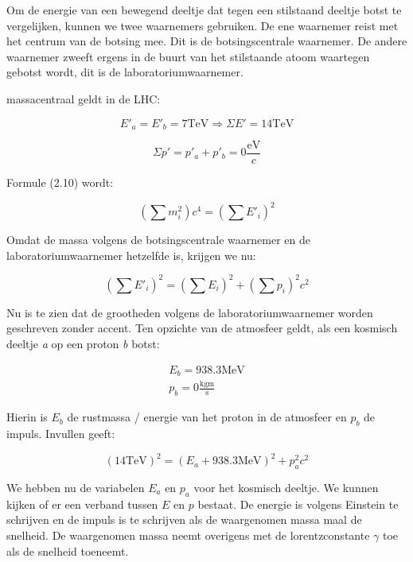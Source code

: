 Om de energie van een bewegend deeltje dat tegen een stilstaand deeltje
botst te vergelijken, kunnen we twee waarnemers gebruiken. De ene
waarnemer reist met het centrum van de botsing mee. Dit is de botsingscentrale
waarnemer. De andere waarnemer zweeft ergens in de buurt van het stilstaande
atoom waartegen gebotst wordt, dit is de laboratoriumwaarnemer.

massacentraal geldt in de LHC:

\begin{equation}
E'_{a}=E'_{b}=7\mathrm{TeV}\Longrightarrow\Sigma E'=\mathrm{14TeV}
\end{equation}


\begin{equation}
\Sigma p'=p'_{a}+p'_{b}=0\frac{\mathrm{eV}}{c}
\end{equation}


Formule (2.10) wordt:

\begin{equation}
\left(\sum m_{i}^{2}\right)c^{4}=\left(\sum E'_{i}\right)^{2}
\end{equation}


Omdat de massa volgens de botsingscentrale waarnemer en de
laboratoriumwaarnemer hetzelfde is, krijgen we nu:

\begin{equation}
\left(\sum E'_{i}\right)^{2}
=\left(\sum E_{i}\right)^{2}+\left(\sum p_{i}\right)^{2}c^{2}
\end{equation}


Nu is te zien dat de grootheden volgens de laboratoriumwaarnemer worden
geschreven zonder accent. Ten opzichte van de atmosfeer geldt, als
een kosmisch deeltje \emph{a} op een proton \emph{b} botst:

\begin{equation}
\begin{array}{c}
E_{b}=938.3\mathrm{MeV}\\
p_{b}=0\mathrm{\frac{kgm}{s}}
\end{array}
\end{equation}


Hierin is $E_{b}$ de rustmassa / energie van het proton in de atmosfeer
en $p_{b}$ de impuls. Invullen geeft:

\begin{equation}
\left(14\mathrm{TeV}\right)^{2}
=\left(E_{a}+938.3\mathrm{MeV}\right)^{2}+p_{a}^{2}c^{2}
\end{equation}


We hebben nu de variabelen $E_{a}$ en $p_{a}$ voor het kosmisch
deeltje. We kunnen kijken of er een verband tussen $E$ en $p$ bestaat.
De energie is volgens Einstein te schrijven en de impuls is te schrijven
als de waargenomen massa maal de snelheid. De waargenomen massa neemt
overigens met de lorentzconstante $\gamma$ toe als de snelheid toeneemt. 


